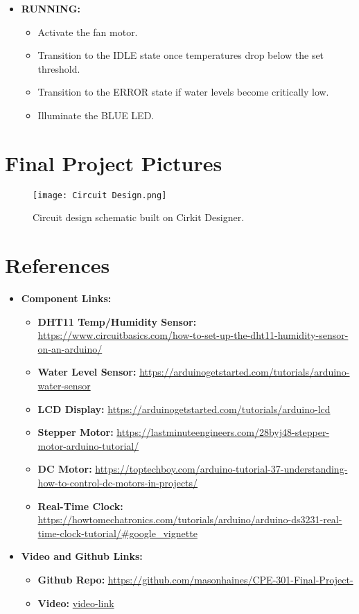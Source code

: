 \documentclass{article}
\begin{document}
\begin{itemize}
    \item \textbf{RUNNING:}
    \begin{itemize}
        \item Activate the fan motor.
        \item Transition to the IDLE state once temperatures drop below the set threshold.
        \item Transition to the ERROR state if water levels become critically low.
        \item Illuminate the BLUE LED.
    \end{itemize}
\end{itemize}



\section{Final Project Pictures} 
\begin{figure}[H]
    \centering
    \texttt{[image: Circuit Design.png]}
    \caption{Circuit design schematic built on Cirkit Designer.}
    \label{fig:1}
\end{figure}

\section {References}
\begin{itemize}
    \item \textbf{Component Links:}
    \begin{itemize}
        \item \textbf{DHT11 Temp/Humidity Sensor:} \url{https://www.circuitbasics.com/how-to-set-up-the-dht11-humidity-sensor-on-an-arduino/}
        \item \textbf{Water Level Sensor:} \url{https://arduinogetstarted.com/tutorials/arduino-water-sensor}
        \item \textbf{LCD Display:} \url{https://arduinogetstarted.com/tutorials/arduino-lcd}
        \item \textbf{Stepper Motor:} \url{https://lastminuteengineers.com/28byj48-stepper-motor-arduino-tutorial/}
        \item \textbf{DC Motor:} 
        \url{https://toptechboy.com/arduino-tutorial-37-understanding-how-to-control-dc-motors-in-projects/}
        \item \textbf{Real-Time Clock:} \url{https://howtomechatronics.com/tutorials/arduino/arduino-ds3231-real-time-clock-tutorial/#google_vignette}
    \end{itemize}
        \item\textbf{Video and Github Links:}
    \begin{itemize}
        \item \textbf{Github Repo:} 
        \url {https://github.com/masonhaines/CPE-301-Final-Project-}
    \end{itemize}
        \begin{itemize}
        \item \textbf{Video:} 
        \url {video-link}
    \end{itemize}
\end{itemize}


\end{document}
